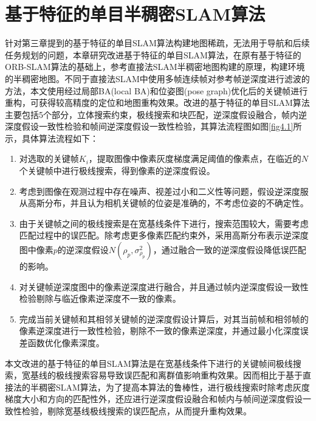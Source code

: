 
\chapter{基于特征的单目半稠密SLAM算法}
\label{chap:Semi-Dense}

针对第三章提到的基于特征的单目SLAM算法构建地图稀疏，无法用于导航和后续任务规划的问题，本章研究改进基于特征的单目SLAM算法，在原有基于特征的ORB-SLAM算法的基础上，参考直接法SLAM半稠密地图构建的原理，构建环境的半稠密地图。不同于直接法SLAM中使用多帧连续帧对参考帧逆深度进行滤波的方法，本文使用经过局部BA(local BA)和位姿图(pose graph)优化后的关键帧进行重构，可获得较高精度的定位和地图重构效果。改进的基于特征的单目SLAM算法主要包括5个部分，立体搜索约束，极线搜索和块匹配，逆深度假设融合，帧内逆深度假设一致性检验和帧间逆深度假设一致性检验，其算法流程图如图\ref{fig4.1}所示，具体算法流程如下：
\begin{enumerate}[label={(\arabic*)}]

\item 对选取的关键帧$K_i$，提取图像中像素灰度梯度满足阈值的像素点，在临近的$N$个关键帧中进行极线搜索，得到像素的逆深度假设。

\item 考虑到图像在观测过程中存在噪声、视差过小和二义性等问题，假设逆深度服从高斯分布，并且认为相机关键帧的位姿是准确的，不考虑位姿的不确定性。

\item 由于关键帧之间的极线搜索是在宽基线条件下进行，搜索范围较大，需要考虑匹配过程中的误匹配。除考虑更多像素匹配约束外，采用高斯分布表示逆深度图中像素$p$的逆深度假设$N(\rho_p, \sigma_{\rho_p}^2)$，通过融合一致的逆深度假设降低误匹配的影响。

\item 对关键帧逆深度图中的像素逆深度进行融合，并且通过帧内逆深度假设一致性检验剔除与临近像素逆深度不一致的像素。

\item 完成当前关键帧和其相邻关键帧的逆深度假设计算后，对其当前帧和相邻帧的像素逆深度进行一致性检验，剔除不一致的像素逆深度，并通过最小化深度误差函数优化像素深度。

\end{enumerate}

本文改进的基于特征的单目SLAM算法是在宽基线条件下进行的关键帧间极线搜索，宽基线的极线搜索容易导致误匹配和离群值影响重构效果。因而相比于基于直接法的半稠密SLAM算法，为了提高本算法的鲁棒性，进行极线搜索时除考虑灰度梯度大小和方向的匹配性外，还应进行逆深度假设融合和帧内与帧间逆深度假设一致性检验，剔除宽基线极线搜索的误匹配点，从而提升重构效果。

